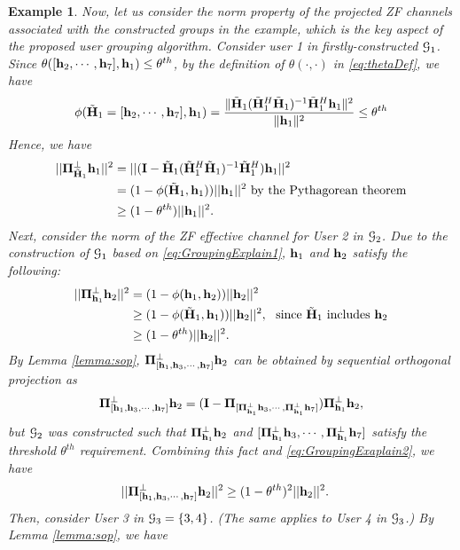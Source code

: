 \documentclass[11pt, draft, onecolumn ]{IEEEtran}
\newtheorem{example}{Example}
\begin{document}
\begin{example}
Now, let us consider the norm  property of the projected ZF channels associated with the constructed groups in the example, which is the key aspect of the proposed user grouping algorithm. Consider user 1 in  firstly-constructed ${\cal G}_1$.  Since $\theta([{\bf h}_2,\cdots,{\bf h}_7],{\bf h}_1) \leq \theta^{th}$, by the definition of $\theta(\cdot,\cdot)$ in \eqref{eq:thetaDef}, we have
\begin{equation} \label{eq:GroupingExplain1}
 \phi(\tilde{{\bf H}}_1=[{\bf h}_2,\cdots,{\bf h}_7],{\bf h}_1) = \frac{\|\tilde{{\bf H}}_1(\tilde{{\bf H}}_1^H\tilde{{\bf H}}_1)^{-1}\tilde{{\bf H}}^H_1 {\bf h}_1\|^2}{\|{\bf h}_1\|^2} \le \theta^{th}
\end{equation}
Hence, we have
\begin{align*}
||{\bf \Pi}_{\tilde{{\bf H}}_1}^\perp {\bf h}_1||^2 &= ||({\bf I} - \tilde{{\bf H}}_1(\tilde{{\bf H}}_1^H\tilde{{\bf H}}_1)^{-1}\tilde{{\bf H}}^H_1 ){\bf h}_1||^2 \\
&=(1- \phi(\tilde{{\bf H}}_1,{\bf h}_1))||{\bf h}_1||^2~\mbox{by the Pythagorean theorem}\\
&\ge (1-\theta^{th})||{\bf h}_1||^2.
\end{align*}
Next, consider the norm of the ZF effective channel for User 2 in ${\cal G}_2$.  Due to the construction of ${\cal G}_1$ based on \eqref{eq:GroupingExplain1}, ${\bf h}_1$ and ${\bf h}_2$ satisfy the following:
\begin{align}
||{\bf \Pi}_{{\bf h}_1}^\perp {\bf h}_2||^2 &= (1-\phi({\bf h}_1,{\bf h}_2))||{\bf h}_2||^2 \nonumber \\
&\ge(1- \phi(\tilde{{\bf H}}_1,{\bf h}_1))||{\bf h}_2||^2, ~~\mbox{since $\tilde{{\bf H}}_1$ includes ${\bf h}_2$} \nonumber\\
&\ge (1-\theta^{th})||{\bf h}_2||^2. \label{eq:GroupingExaplain2}
\end{align}
By Lemma \ref{lemma:sop}, ${\bf \Pi}_{[{\bf h}_1,{\bf h}_3,\cdots,{\bf h}_7]}^\perp{\bf h}_2$ can be obtained by sequential orthogonal projection as
\[
{\bf \Pi}_{[{\bf h}_1,{\bf h}_3,\cdots,{\bf h}_7]}^\perp{\bf h}_2=({\bf I} - {\bf \Pi}_{[{\bf \Pi}_{{\bf h}_1}^\perp{\bf h}_3,\cdots,{\bf \Pi}_{{\bf h}_1}^\perp{\bf h}_7]})   {\bf \Pi}_{{\bf h}_1}^\perp{\bf h}_2,
\]but ${\cal G}_2$ was constructed such that ${\bf \Pi}_{{\bf h}_1}^\perp{\bf h}_2$ and $[{\bf \Pi}_{{\bf h}_1}^\perp{\bf h}_3,\cdots,{\bf \Pi}_{{\bf h}_1}^\perp{\bf h}_7]$ satisfy the threshold $\theta^{th}$ requirement.  Combining this fact and \eqref{eq:GroupingExaplain2}, we have
\begin{align*}
||{\bf \Pi}_{[{\bf h}_1,{\bf h}_3,\cdots,{\bf h}_7]}^\perp{\bf h}_2||^2 &\ge(1- \theta^{th})^2||{\bf h}_2||^2.
\end{align*}
Then, consider  User 3 in ${\cal G}_3=\{3,4\}$. (The same applies to User 4 in ${\cal G}_3$.) By Lemma \ref{lemma:sop}, we have

\end{example}
\end{document}
